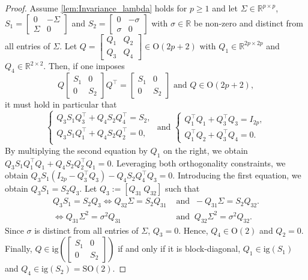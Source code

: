 \documentclass[10pt,twoside,dvipsnames]{siamart1116}
\numberwithin{algorithm}{section}
\numberwithin{equation}{section}
\begin{document}
\begin{proof}
		Assume \cref{lem:Invariance_lambda} holds for $p\geq 1$ and let $\Sigma\in\mathbb{R}^{p\times p}$, $S_1 = \left[\begin{smallmatrix}
			0&-\Sigma\\
			\Sigma& 0
			\end{smallmatrix}\right]$ and $S_2 = \left[\begin{smallmatrix}
			0&-\sigma\\
			\sigma& 0
			\end{smallmatrix}\right]$ with $\sigma\in\mathbb{R}$ be non-zero and distinct from all entries of $\Sigma$. Let $Q=\left[\begin{smallmatrix}
			Q_1&Q_2\\
			Q_3&Q_4
			\end{smallmatrix}\right]\in\mathrm{O}(2p+2)$ with $Q_1\in\mathbb{R}^{2p\times 2p}$ and $Q_4\in\mathbb{R}^{2\times 2}$. Then, if one imposes\begin{equation*}
			Q\begin{bmatrix}
			S_1&0\\
			0&S_2
			\end{bmatrix}Q^\top =\begin{bmatrix}
			S_1&0\\
			0&S_2
			\end{bmatrix} \text{ and } Q\in \mathrm{O}(2p+2),
			\end{equation*}
			it must hold in particular that
			\begin{equation*}
			\begin{cases}
			Q_3 S_1 Q_3^\top  + Q_4 S_2 Q_4^\top  = S_2,\\
			Q_3 S_1 Q_1^\top  + Q_4 S_2 Q_2^\top  = 0,\\
			\end{cases} \text{ and } \begin{cases}
			Q_1^\top Q_1 + Q_3^\top Q_3 = I_{2p},\\
			Q_1^\top Q_2 + Q_3^\top Q_4 = 0.
			\end{cases}
			\end{equation*}
			By multiplying the second equation by $Q_1$ on the right, we obtain $Q_3 S_1 Q_1^\top Q_1 + Q_4 S_2 Q_2^\top Q_1 = 0$. Leveraging both orthogonality constraints, we obtain $Q_3S_1(I_{2p}-Q_3^\top Q_3)-Q_4S_2Q_4^\top Q_3=0$. Introducing the first equation, we obtain $Q_3S_1=S_2Q_3$. Let $Q_3:=[Q_{31}\ Q_{32}]$ such that \begin{align*}
		Q_3S_1=S_2Q_3 \iff Q_{32}\Sigma = S_2 Q_{31} &\text{ and } \ -Q_{31}\Sigma= S_2Q_{32}.\\
		\iff Q_{31}\Sigma^2 = \sigma^2 Q_{31} &\text{ and } \ Q_{32}\Sigma^2 = \sigma^2 Q_{32}.
\end{align*}			 
 Since $\sigma$ is distinct from all entries of $\Sigma$, $Q_3=0$. Hence, $Q_4\in\mathrm{O}(2)$ and $Q_2=0$. Finally, $Q\in \mathrm{ig}\left(\left[\begin{smallmatrix}
			S_1&0\\
			0&S_2
			\end{smallmatrix}\right]\right)$ if and only if it is block-diagonal, $Q_1\in\mathrm{ig}(S_1)$ and $Q_4\in\mathrm{ig}(S_2)=\mathrm{SO}(2)$.
			

\end{proof}
\end{document}
